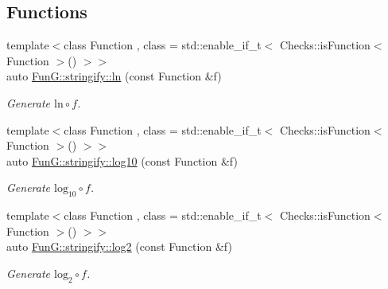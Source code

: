 \subsection*{Functions}
\begin{DoxyCompactItemize}
\item 
{\footnotesize template$<$class Function , class  = std\-::enable\-\_\-if\-\_\-t$<$ Checks\-::is\-Function$<$ Function $>$() $>$$>$ }\\auto \hyperlink{namespaceFunG_1_1stringify_abefe44a652173ce98927b0d432ad3547}{Fun\-G\-::stringify\-::ln} (const Function \&f)
\begin{DoxyCompactList}\small\item\em Generate $ \mathrm{ln}\circ f $. \end{DoxyCompactList}\item 
{\footnotesize template$<$class Function , class  = std\-::enable\-\_\-if\-\_\-t$<$ Checks\-::is\-Function$<$ Function $>$() $>$$>$ }\\auto \hyperlink{namespaceFunG_1_1stringify_af0b292572bbf39d619243535b833c17d}{Fun\-G\-::stringify\-::log10} (const Function \&f)
\begin{DoxyCompactList}\small\item\em Generate $ \mathrm{log}_{10}\circ f $. \end{DoxyCompactList}\item 
{\footnotesize template$<$class Function , class  = std\-::enable\-\_\-if\-\_\-t$<$ Checks\-::is\-Function$<$ Function $>$() $>$$>$ }\\auto \hyperlink{namespaceFunG_1_1stringify_a6815627cdbde7b81d56ec5a6377b5e47}{Fun\-G\-::stringify\-::log2} (const Function \&f)
\begin{DoxyCompactList}\small\item\em Generate $ \mathrm{log}_{2}\circ f $. \end{DoxyCompactList}\end{DoxyCompactItemize}
